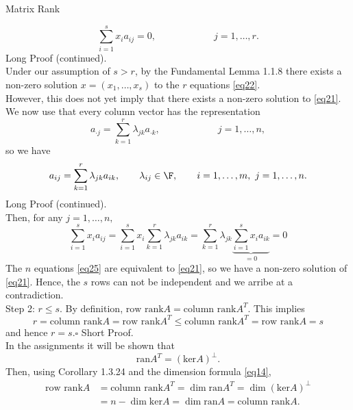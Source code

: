 \documentclass[smaller,hyperref={CJKbookmarks=true}]{beamer}
\begin{document}
\begin{frame}{Matrix Rank}
\begin{spacing}{1}
\begin{equation}\label{eq22}
  \sum_{i=1}^{s}x_ia_{ij}=0,\qquad\qquad\qquad j=1,\ldots,r.
\end{equation}
\newpage
\alert{Long Proof (continued).}\\[7pt]
Under our assumption of $s>r$, by the Fundamental Lemma 1.1.8 there exists a non-zero solution $x=(x_1,\ldots,x_s)$ to the $r$ equations \eqref{eq22}.\\
However, this does not yet imply that there exists a non-zero solution to \eqref{eq21}.\\[6pt]
We now use that every column vector has the representation
\begin{equation}\label{eq23}
  a_{\cdot j}=\sum_{k=1}^{r}\lambda_{jk}a_{\cdot k},\qquad\qquad\qquad j=1,\ldots,n,
\end{equation}
so we have
\begin{equation}\label{eq24}
  a_{ij}=\sum_{k=1}^{r}\lambda_{jk}a_{ik},\qquad
  \lambda_{ij}\in\F,\qquad i=1,\ldots,m,~j=1,\ldots,n.
\end{equation}
\newpage
\alert{Long Proof (continued).}\\[7pt]
Then, for any $j=1,\ldots,n,$
\begin{equation}\label{eq25}
  \sum_{i=1}^{s}x_ia_{ij}=\sum_{i=1}^{s}x_i\sum_{k=1}^{r}\lambda_{jk}a_{ik}=\sum_{k=1}^{r}\lambda_{jk}\underbrace{\sum_{i=1}^{s}x_ia_{ik}}_{=0}=0
\end{equation}
The $n$ equations \eqref{eq25} are equivalent to \eqref{eq21}, so we have a non-zero solution of \eqref{eq21}. Hence, the $s$ rows can not be independent and we arribe at a contradiction.\\[5pt]
\alert{Step 2: $r\leq s.$} By definition, $\text{row rank}A=\text{column rank}A^T$. This implies \[r=\text{column rank}A=\text{row rank}A^T\leq\text{column rank}A^T=\text{row rank}A=s\]
and hence $r=s$.$\square$
\newpage
\alert{Short Proof.}\\
In the assignments it will be shown that
\[\text{ran}A^T=(\text{ker}A)^{\perp}.\]
Then, using Corollary 1.3.24 and the dimension formula \eqref{eq14},
\begin{equation*}
  \begin{split}
     \text{row rank}A &=\text{column rank}A^T=\dim\text{ran}A^T=\dim(\text{ker}A)^{\perp} \\
       &=n-\dim\text{ker}A=\dim\text{ran}A=\text{column rank}A.
  \end{split}
\end{equation*}
\end{spacing}
\end{frame}
\end{document}
